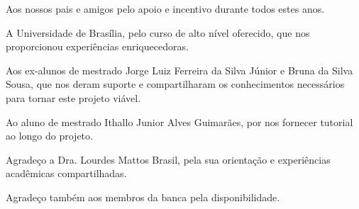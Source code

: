 \begin{agradecimentos}
Aos nossos pais e amigos pelo apoio e incentivo durante todos estes anos.

A Universidade de Brasília, pelo curso de alto nível oferecido, que nos proporcionou experiências enriquecedoras.

Aos ex-alunos de mestrado Jorge Luiz Ferreira da Silva Júnior e Bruna da Silva Sousa, que nos deram suporte e compartilharam os conhecimentos necessários para tornar este projeto viável.

Ao aluno de mestrado Ithallo Junior Alves Guimarães, por nos fornecer tutorial ao longo do projeto.

Agradeço a Dra. Lourdes Mattos Brasil, pela sua orientação e experiências acadêmicas compartilhadas.

Agradeço também aos membros da banca pela disponibilidade.    

\end{agradecimentos}
